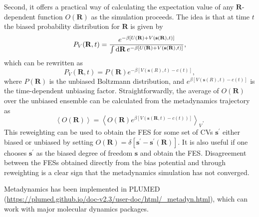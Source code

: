 Second, it offers a practical way of calculating the expectation value of any $\mathbf{R}$-dependent function $O(\mathbf{R})$ as the simulation proceeds. The idea is that at time $t$ the biased probability distribution for $\mathbf{R}$ is given by
\begin{equation}
    P_V{(\mathbf{R},t)}=\frac{e^{-\beta\left[U(\mathbf{R})+V(\mathbf{s}(\mathbf{R}),t)\right]}}{\int \mathop{}\!\mathrm{d} \mathbf{R}\, e^{-\beta\left[U(\mathbf{R})+V(\mathbf{s}(\mathbf{R}),t)\right]}},
\end{equation}
which can be rewritten as
\begin{equation}
    P_V{(\mathbf{R},t)}=P{(\mathbf{R})}e^{-\beta\left[V(\mathbf{s}(R),t)-c(t)\right]},
\end{equation}
where $P{(\mathbf{R})}$ is the unbiased Boltzmann distribution, and $e^{\beta\left[V(\mathbf{s}(R),t)-c(t)\right]}$ is the time-dependent unbiasing factor. Straightforwardly, the average of $O(\mathbf{R})$ over the unbiased ensemble can be calculated from the metadynamics trajectory as
\begin{equation}
    \left<O(\mathbf{R})\right>=\left<O(\mathbf{R})e^{\beta\left[V(\mathbf{s}(\mathbf{R},t)-c(t))\right]}\right>_V.	
\end{equation}
This reweighting can be used to obtain the FES for some set of CVs $\mathbf{s}^\prime$ either biased or unbiased by setting $O(\mathbf{R})=\delta[\mathbf{s}^\prime-\mathbf{s}^\prime(\mathbf{R})]$. It is also useful if one chooses $\mathbf{s}^\prime$ as the biased degree of freedom $\mathbf{s}$ and obtain the FES. Disagreement between the FESs obtained directly from the bias potential and through reweighting is a clear sign that the metadynamics simulation has not converged.

Metadynamics has been implemented in PLUMED (\url{https://plumed.github.io/doc-v2.3/user-doc/html/_metadyn.html}), which can work with major molecular dynamics packages.